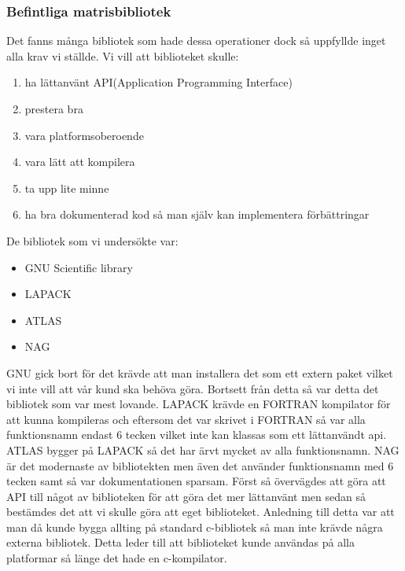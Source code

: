 \subsubsection{Befintliga matrisbibliotek}
Det fanns många bibliotek som hade dessa operationer dock så uppfyllde inget alla krav vi ställde. Vi vill att biblioteket skulle:
\begin{enumerate}
\item ha lättanvänt API(Application Programming Interface)
\item prestera bra
\item vara platformsoberoende
\item vara lätt att kompilera
\item ta upp lite minne
\item ha bra dokumenterad kod så man själv kan implementera förbättringar
\end{enumerate} 
De bibliotek som vi undersökte var:
\begin{itemize}

\item GNU Scientific library
\item LAPACK
\item ATLAS
\item NAG

\end{itemize}
GNU gick bort för det krävde att man installera det som ett extern paket vilket vi inte vill att vår kund ska behöva göra. Bortsett från detta så var detta det bibliotek som var mest lovande. 
LAPACK krävde en FORTRAN kompilator för att kunna kompileras och eftersom det var skrivet i FORTRAN så var alla funktionsnamn endast 6 tecken vilket inte kan klassas som ett lättanvändt api.
ATLAS bygger på LAPACK så det har ärvt mycket av alla funktionsnamn.
NAG är det modernaste av bibliotekten men även det använder funktionsnamn med 6 tecken samt så var dokumentationen sparsam. 
\newline
\newline
Först så övervägdes att göra att API till något av biblioteken för att göra det mer lättanvänt men sedan så bestämdes det att vi skulle göra att eget biblioteket. Anledning till detta var att man då kunde bygga allting på standard c-bibliotek så man inte krävde några externa bibliotek. Detta leder till att biblioteket kunde användas på alla platformar så länge det hade en c-kompilator. 


